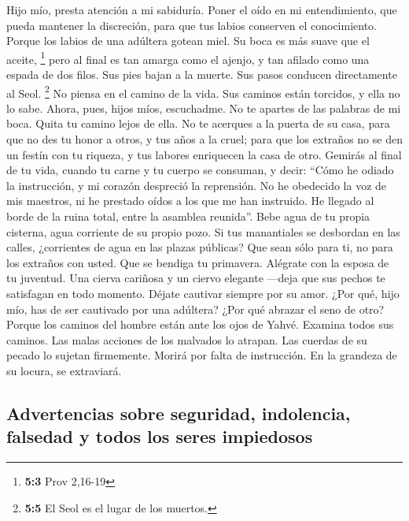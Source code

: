  Hijo mío, presta atención a mi sabiduría. Poner el oído
en mi entendimiento,  que pueda mantener la discreción,
para que tus labios conserven el conocimiento.  Porque los
labios de una adúltera gotean miel. Su boca es más suave que el aceite,
\footnote{\textbf{5:3} Prov 2,16-19}  pero al final es tan
amarga como el ajenjo, y tan afilado como una espada de dos filos.
 Sus pies bajan a la muerte. Sus pasos conducen
directamente al Seol. \footnote{\textbf{5:5} El Seol es el lugar de los
  muertos.}  No piensa en el camino de la vida. Sus
caminos están torcidos, y ella no lo sabe.  Ahora, pues,
hijos míos, escuchadme. No te apartes de las palabras de mi boca.
 Quita tu camino lejos de ella. No te acerques a la puerta
de su casa,  para que no des tu honor a otros, y tus años
a la cruel;  para que los extraños no se den un festín
con tu riqueza, y tus labores enriquecen la casa de otro.
 Gemirás al final de tu vida, cuando tu carne y tu cuerpo
se consuman,  y decir: ``Cómo he odiado la instrucción, y
mi corazón despreció la reprensión.  No he obedecido la
voz de mis maestros, ni he prestado oídos a los que me han instruido.
 He llegado al borde de la ruina total, entre la asamblea
reunida''.  Bebe agua de tu propia cisterna, agua
corriente de su propio pozo.  Si tus manantiales se
desbordan en las calles, ¿corrientes de agua en las plazas públicas?
 Que sean sólo para ti, no para los extraños con usted.
 Que se bendiga tu primavera. Alégrate con la esposa de
tu juventud.  Una cierva cariñosa y un ciervo elegante
---deja que sus pechos te satisfagan en todo momento. Déjate cautivar
siempre por su amor.  ¿Por qué, hijo mío, has de ser
cautivado por una adúltera? ¿Por qué abrazar el seno de otro?
 Porque los caminos del hombre están ante los ojos de
Yahvé. Examina todos sus caminos.  Las malas acciones de
los malvados lo atrapan. Las cuerdas de su pecado lo sujetan firmemente.
 Morirá por falta de instrucción. En la grandeza de su
locura, se extraviará.

\hypertarget{advertencias-sobre-seguridad-indolencia-falsedad-y-todos-los-seres-impiedosos}{%
\subsection{Advertencias sobre seguridad, indolencia, falsedad y todos
los seres
impiedosos}\label{advertencias-sobre-seguridad-indolencia-falsedad-y-todos-los-seres-impiedosos}}

